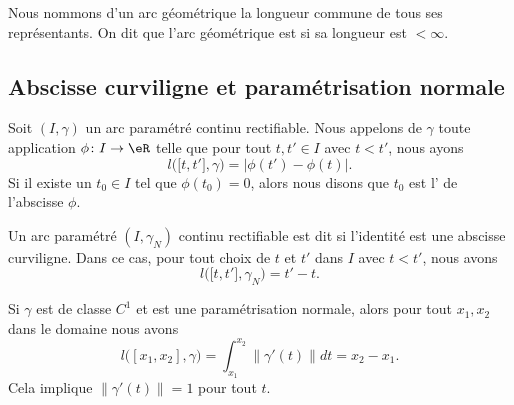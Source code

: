 \begin{definition}
    Nous nommons  d'un arc géométrique la longueur commune de tous ses représentants. On dit que l'arc géométrique est  si sa longueur est $<\infty$.
\end{definition}

\subsection{Abscisse curviligne et paramétrisation normale}     \label{SubSecAbsCurv}

\begin{definition}
Soit $(I,\gamma)$ un arc paramétré continu rectifiable. Nous appelons  de $\gamma$ toute application $\phi\colon I\to \eR$ telle que pour tout $t,t'\in I$ avec $t<t'$, nous ayons
\begin{equation}
    l\big( \mathopen[ t,t'  \mathclose],\gamma\big) = \big|  \phi(t')-\phi(t) \big|.
\end{equation}
Si il existe un $t_0\in I$ tel que $\phi(t_0)=0$, alors nous disons que $t_0$ est l' de l'abscisse $\phi$.

Un arc paramétré $(I,\gamma_N)$ continu rectifiable est dit  si l'identité est une abscisse curviligne. Dans ce cas, pour tout choix de $t$ et $t'$ dans $I$ avec $t<t'$, nous avons
\begin{equation}
    l\big( \mathopen[ t , t' \mathclose],\gamma_N \big)=t'-t.
\end{equation}
\end{definition}

%
%

\begin{normaltext}
    Si \( \gamma\) est de classe \( C^1\) et est une paramétrisation normale, alors pour tout \( x_1,x_2\) dans le domaine nous avons
    \begin{equation}
        l\big( [x_1,x_2],\gamma \big)=\int_{x_1}^{x_2}\| \gamma'(t) \|dt=x_2-x_1.
    \end{equation}
    Cela implique \( \| \gamma'(t) \|=1\) pour tout \( t\).
\end{normaltext}

